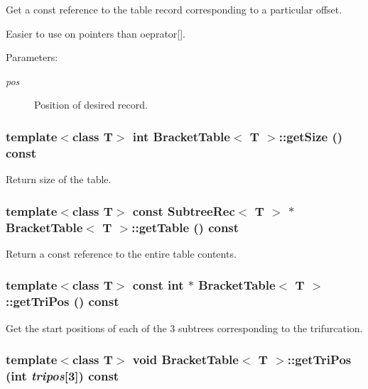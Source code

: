 Get a const reference to the table record corresponding to a particular offset. 

Easier to use on pointers than oeprator[]. \begin{Desc}
\item[Parameters:]
\begin{description}
\item[{\em pos}]Position of desired record. \end{description}
\end{Desc}
\subsubsection{\setlength{\rightskip}{0pt plus 5cm}template$<$class T$>$ int {\bf Bracket\-Table}$<$ T $>$::get\-Size () const}\label{classBracketTable_a4}


Return size of the table. 

\subsubsection{\setlength{\rightskip}{0pt plus 5cm}template$<$class T$>$ const {\bf Subtree\-Rec}$<$ T $>$ $\ast$ {\bf Bracket\-Table}$<$ T $>$::get\-Table () const\hspace{0.3cm}{\tt  [inline]}}\label{classBracketTable_a7}


Return a const reference to the entire table contents. 

\subsubsection{\setlength{\rightskip}{0pt plus 5cm}template$<$class T$>$ const int $\ast$ {\bf Bracket\-Table}$<$ T $>$::get\-Tri\-Pos () const\hspace{0.3cm}{\tt  [inline]}}\label{classBracketTable_a13}


Get the start positions of each of the 3 subtrees corresponding to the trifurcation. 

\subsubsection{\setlength{\rightskip}{0pt plus 5cm}template$<$class T$>$ void {\bf Bracket\-Table}$<$ T $>$::get\-Tri\-Pos (int {\em tripos}[3]) const\hspace{0.3cm}{\tt  [inline]}}\label{classBracketTable_a12}


